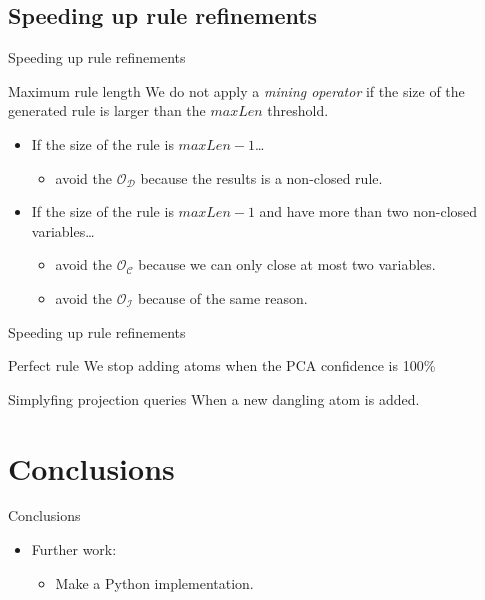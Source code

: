 \documentclass[xcolor={x11names}]{beamer}
\begin{document}
\subsection{Speeding up rule refinements}
\begin{frame}{Speeding up rule refinements}

    \begin{block}{Maximum rule length}
        We do not apply a \textit{mining operator} if the size of the generated rule is 
        larger than the \textbf{$maxLen$} threshold.
	\end{block}

	\begin{itemize}
        \item If the size of the rule is \textbf{$maxLen -1$}\ldots
	        \begin{itemize}
                \item avoid the $\mathcal{O}_\mathcal{D}$ because the results is a non-closed rule.
	        \end{itemize}
        \item If the size of the rule is \textbf{$maxLen -1$} and have more than two non-closed variables\ldots
	        \begin{itemize}
                \item avoid the $\mathcal{O}_\mathcal{C}$ because we can only close at most two variables.
                \item avoid the $\mathcal{O}_\mathcal{I}$ because of the same reason.
	        \end{itemize}
	\end{itemize}

\end{frame}

\begin{frame}{Speeding up rule refinements}

    \begin{block}{Perfect rule}
        We stop adding atoms when the PCA confidence is 100\%
	\end{block}

    \begin{block}{Simplyfing projection queries}
        When a new dangling atom is added.
	\end{block}

\end{frame}

\section{Conclusions}

\begin{frame}{Conclusions}
	\begin{itemize}
   		\item Further work:
	    \begin{itemize}
   		    \item Make a Python implementation.
	    \end{itemize}
	\end{itemize}
\end{frame}
\end{document}
